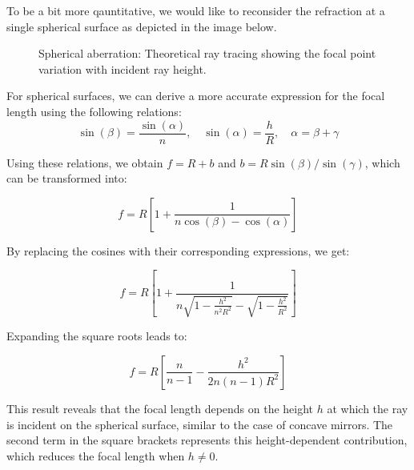 \documentclass[
  a4paper,
]{book}
\begin{document}
To be a bit more qauntitative, we would like to reconsider the
refraction at a single spherical surface as depicted in the image below.

\begin{figure}


\caption{\label{fig-spherical-theo}Spherical aberration: Theoretical ray
tracing showing the focal point variation with incident ray height.}

\end{figure}%

For spherical surfaces, we can derive a more accurate expression for the
focal length using the following relations:
\[\sin(\beta)=\frac{\sin(\alpha)}{n}, \quad \sin(\alpha)=\frac{h}{R}, \quad \alpha=\beta+\gamma\]

Using these relations, we obtain \(f=R+b\) and
\(b=R\sin(\beta)/\sin(\gamma)\), which can be transformed into:

\[
f=R\left [ 1+ \frac{1}{n\cos(\beta)-\cos(\alpha)}\right ]
\]

By replacing the cosines with their corresponding expressions, we get:

\[
f=R\left [ 1+ \frac{1}{n\sqrt{1-\frac{h^2}{n^2 R^2}}-\sqrt{1-\frac{h^2}{R^2}}}\right ]
\]

Expanding the square roots leads to:

\[
f=R\left [ \frac{n}{n-1}- \frac{h^2}{2n(n-1)R^2} \right]
\]

This result reveals that the focal length depends on the height \(h\) at
which the ray is incident on the spherical surface, similar to the case
of concave mirrors. The second term in the square brackets represents
this height-dependent contribution, which reduces the focal length when
\(h\neq 0\).
\end{document}
